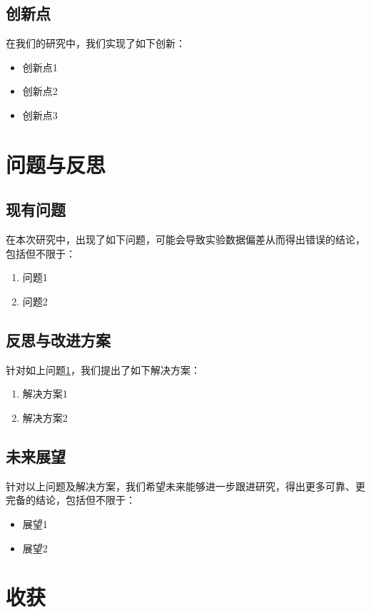 \documentclass[12pt,a4paper]{article}
\begin{document}
\subsection{创新点}
在我们的研究中，我们实现了如下创新：
\begin{itemize}
    \item 创新点1
    \item 创新点2
    \item 创新点3
\end{itemize}

\section{问题与反思}\label{sec:problem}
\subsection{现有问题}
在本次研究中，出现了如下问题，可能会导致实验数据偏差从而得出错误的结论，包括但不限于：
\begin{enumerate}
    \item 问题1
    \item 问题2
\end{enumerate}

\subsection{反思与改进方案}
针对如上问题\ref{sec:problem}，我们提出了如下解决方案：
\begin{enumerate}
    \item 解决方案1
    \item 解决方案2
\end{enumerate}

\subsection{未来展望}
针对以上问题及解决方案，我们希望未来能够进一步跟进研究，得出更多可靠、更完备的结论，包括但不限于：
\begin{itemize}
    \item 展望1
    \item 展望2
\end{itemize}

\section{收获}
\end{document}
